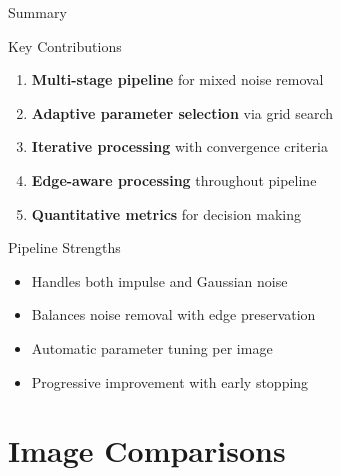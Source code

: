 \documentclass[aspectratio=169]{beamer}
\begin{document}
\begin{frame}{Summary}
    \begin{block}{Key Contributions}
        \begin{enumerate}
            \item \textbf{Multi-stage pipeline} for mixed noise removal
            \item \textbf{Adaptive parameter selection} via grid search
            \item \textbf{Iterative processing} with convergence criteria
            \item \textbf{Edge-aware processing} throughout pipeline
            \item \textbf{Quantitative metrics} for decision making
        \end{enumerate}
    \end{block}
    
    \begin{block}{Pipeline Strengths}
        \begin{itemize}
            \item Handles both impulse and Gaussian noise
            \item Balances noise removal with edge preservation
            \item Automatic parameter tuning per image
            \item Progressive improvement with early stopping
        \end{itemize}
    \end{block}
\end{frame}



\section{Image Comparisons}
\end{document}

